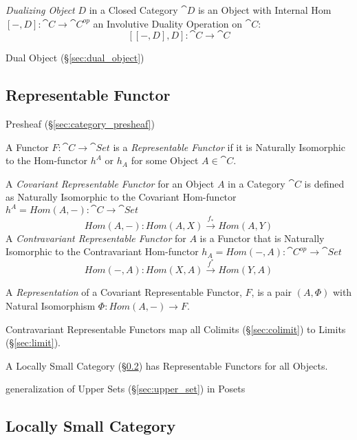 \emph{Dualizing Object} $D$ in a Closed Category $\cat{D}$ is an
Object with Internal Hom $[-,D]: \cat{C} \rightarrow \cat{C}^{op}$ an
Involutive Duality Operation on $\cat{C}$: %
\[
  [[-,D],D]: \cat{C} \rightarrow \cat{C}
\]

Dual Object (\S\ref{sec:dual_object})



\subsection{Representable Functor}\label{sec:representable_functor}

Presheaf (\S\ref{sec:category_presheaf})

A Functor $F : \cat{C} \rightarrow \cat{Set}$ is a
\emph{Representable Functor} if it is Naturally Isomorphic to the
Hom-functor $h^A$ or $h_A$ for some Object $A \in \cat{C}$.

A \emph{Covariant Representable Functor} for an Object $A$ in a
Category $\cat{C}$ is defined as Naturally Isomorphic to the
Covariant Hom-functor $h^A = Hom(A,-) : \cat{C} \rightarrow
\cat{Set}$
\[
  Hom(A,-) : Hom(A,X) \xrightarrow{f_*} Hom(A,Y)
\]
A \emph{Contravariant Representable Functor} for $A$ is a Functor that
is Naturally Isomorphic to the Contravariant Hom-functor $h_A =
Hom(-,A) : \cat{C^{op}} \rightarrow \cat{Set}$
\[
  Hom(-,A) : Hom(X,A) \xrightarrow{f^*} Hom(Y,A)
\]

A \emph{Representation} of a Covariant Representable Functor, $F$, is
a pair $(A, \Phi)$ with Natural Isomorphism $\Phi : Hom(A,-)
\rightarrow F$.

Contravariant Representable Functors map all Colimits
(\S\ref{sec:colimit}) to Limits (\S\ref{sec:limit}).

A Locally Small Category (\S\ref{sec:locally_small}) has Representable
Functors for all Objects.

generalization of Upper Sets (\S\ref{sec:upper_set}) in Posets



\subsection{Locally Small Category}\label{sec:locally_small}

